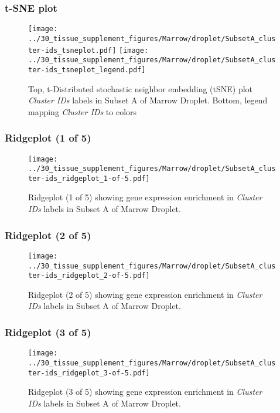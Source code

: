 \clearpage
\subsubsection{t-SNE plot}
\begin{figure}[h]
\centering
\texttt{[image: ../30\_tissue\_supplement\_figures/Marrow/droplet/SubsetA\_cluster-ids\_tsneplot.pdf]}
\texttt{[image: ../30\_tissue\_supplement\_figures/Marrow/droplet/SubsetA\_cluster-ids\_tsneplot\_legend.pdf]}
\caption{Top, t-Distributed stochastic neighbor embedding (tSNE) plot  \emph{Cluster IDs} labels in Subset A of Marrow Droplet. Bottom, legend mapping \emph{Cluster IDs} to colors}
\end{figure}


\clearpage

\subsubsection{Ridgeplot (1 of 5)}
\begin{figure}[h]
\centering
\texttt{[image: ../30\_tissue\_supplement\_figures/Marrow/droplet/SubsetA\_cluster-ids\_ridgeplot\_1-of-5.pdf]}

\caption{ Ridgeplot (1 of 5)  showing gene expression enrichment in \emph{Cluster IDs} labels in Subset A of Marrow Droplet. }
\end{figure}


\clearpage

\subsubsection{Ridgeplot (2 of 5)}
\begin{figure}[h]
\centering
\texttt{[image: ../30\_tissue\_supplement\_figures/Marrow/droplet/SubsetA\_cluster-ids\_ridgeplot\_2-of-5.pdf]}

\caption{ Ridgeplot (2 of 5)  showing gene expression enrichment in \emph{Cluster IDs} labels in Subset A of Marrow Droplet. }
\end{figure}


\clearpage

\subsubsection{Ridgeplot (3 of 5)}
\begin{figure}[h]
\centering
\texttt{[image: ../30\_tissue\_supplement\_figures/Marrow/droplet/SubsetA\_cluster-ids\_ridgeplot\_3-of-5.pdf]}

\caption{ Ridgeplot (3 of 5)  showing gene expression enrichment in \emph{Cluster IDs} labels in Subset A of Marrow Droplet. }
\end{figure}


